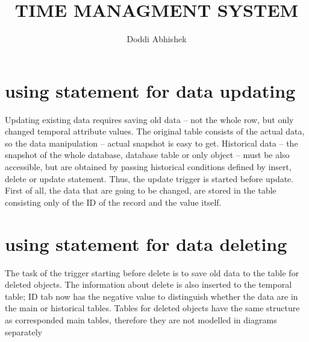 \documentclass{article}
\title{TIME MANAGMENT SYSTEM}
\author{Doddi Abhishek}
\begin{document}
\maketitle






\section{using statement for data updating}
Updating existing data requires saving old data – not the whole row, but only changed temporal attribute values. The
original table consists of the actual data, so the data manipulation – actual snapshot is easy to get. Historical data
– the snapshot of the whole database, database table or only object – must be also accessible, but are obtained by
passing historical conditions defined by insert, delete or update statement. Thus, the update trigger is started before
update. First of all, the data that are going to be changed, are stored in the table consisting only of the ID of the record
and the value itself.

\section{using statement for data deleting}
The task of the trigger starting before delete is to save old data to the table for deleted objects. The information about
delete is also inserted to the temporal table; ID tab now has the negative value to distinguish whether the data are in
the main or historical tables. Tables for deleted objects have the same structure as corresponded main tables, therefore
they are not modelled in diagrams separately
\end{document}
